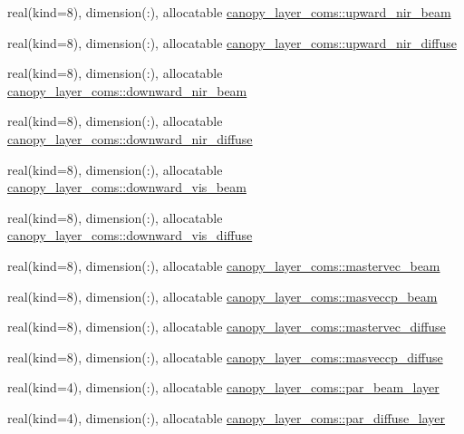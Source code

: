 \begin{DoxyCompactItemize}
\item 
real(kind=8), dimension(\+:), allocatable \hyperlink{namespacecanopy__layer__coms_a87d36be7a31ec3b7987bb3d6229d351c}{canopy\+\_\+layer\+\_\+coms\+::upward\+\_\+nir\+\_\+beam}
\item 
real(kind=8), dimension(\+:), allocatable \hyperlink{namespacecanopy__layer__coms_a6d5e9951def0e14a6090ee63c3580188}{canopy\+\_\+layer\+\_\+coms\+::upward\+\_\+nir\+\_\+diffuse}
\item 
real(kind=8), dimension(\+:), allocatable \hyperlink{namespacecanopy__layer__coms_a32aa604fa9c594a9d4256b80bd3ebf29}{canopy\+\_\+layer\+\_\+coms\+::downward\+\_\+nir\+\_\+beam}
\item 
real(kind=8), dimension(\+:), allocatable \hyperlink{namespacecanopy__layer__coms_aca68716ee0d7012206db14db5e8efdf0}{canopy\+\_\+layer\+\_\+coms\+::downward\+\_\+nir\+\_\+diffuse}
\item 
real(kind=8), dimension(\+:), allocatable \hyperlink{namespacecanopy__layer__coms_ab664e3f1fcb600d0d80f4f2b20826118}{canopy\+\_\+layer\+\_\+coms\+::downward\+\_\+vis\+\_\+beam}
\item 
real(kind=8), dimension(\+:), allocatable \hyperlink{namespacecanopy__layer__coms_a3daf45d80c36a9b92a031d8865ceb5a8}{canopy\+\_\+layer\+\_\+coms\+::downward\+\_\+vis\+\_\+diffuse}
\item 
real(kind=8), dimension(\+:), allocatable \hyperlink{namespacecanopy__layer__coms_a0180ffcdf520f0876e1b0246cc2f97d0}{canopy\+\_\+layer\+\_\+coms\+::mastervec\+\_\+beam}
\item 
real(kind=8), dimension(\+:), allocatable \hyperlink{namespacecanopy__layer__coms_aa497d207474180b1a8215250f6286485}{canopy\+\_\+layer\+\_\+coms\+::masveccp\+\_\+beam}
\item 
real(kind=8), dimension(\+:), allocatable \hyperlink{namespacecanopy__layer__coms_a537b438ef5e2426f6492828a07cc39bf}{canopy\+\_\+layer\+\_\+coms\+::mastervec\+\_\+diffuse}
\item 
real(kind=8), dimension(\+:), allocatable \hyperlink{namespacecanopy__layer__coms_a5829c4d720040869057cadfcf66e9a7c}{canopy\+\_\+layer\+\_\+coms\+::masveccp\+\_\+diffuse}
\item 
real(kind=4), dimension(\+:), allocatable \hyperlink{namespacecanopy__layer__coms_ab82446f080b96462d61f0c057b74b0dc}{canopy\+\_\+layer\+\_\+coms\+::par\+\_\+beam\+\_\+layer}
\item 
real(kind=4), dimension(\+:), allocatable \hyperlink{namespacecanopy__layer__coms_ae8f5c50b386e8289dcc0bbe7e46713ab}{canopy\+\_\+layer\+\_\+coms\+::par\+\_\+diffuse\+\_\+layer}

\end{DoxyCompactItemize}
